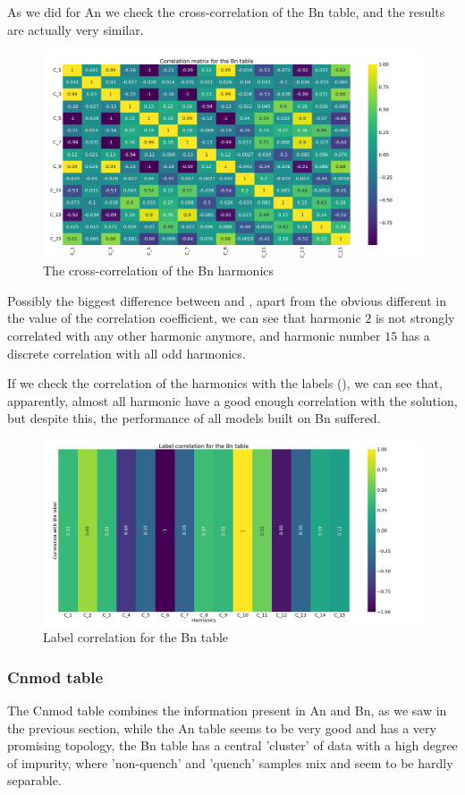 As we did for An we check the cross-correlation of the Bn table, and the results are actually very
similar.
\begin{figure}[h!]
	\centering
	\includegraphics[scale=.2]{img/Bn_corr_matrix.png}
	\caption{The cross-correlation of the Bn harmonics} \label{fig:bn-corr}
\end{figure}
Possibly the biggest difference between  and , apart from the
obvious different in the value of the correlation coefficient, we can see that harmonic $2$ is not
strongly correlated with any other harmonic anymore, and harmonic number $15$ has a discrete
correlation with all odd harmonics.

If we check the correlation of the harmonics with the labels (), we can see that, apparently, almost all
harmonic have a good enough correlation with the solution, but despite this, the performance of all
models built on Bn suffered.
\begin{figure}
	\centering
	\includegraphics[scale=.2]{img/Bn_label_corr.png}
	\caption{Label correlation for the Bn table} \label{fig:bn-lcorr}
\end{figure}

\subsubsection{Cnmod table}
The Cnmod table combines the information present in An and Bn, as we saw in the previous section,
while the An table seems to be very good and has a very promising topology, the Bn table has a
central 'cluster' of data with a high degree of impurity, where 'non-quench' and 'quench' samples
mix and seem to be hardly separable.

